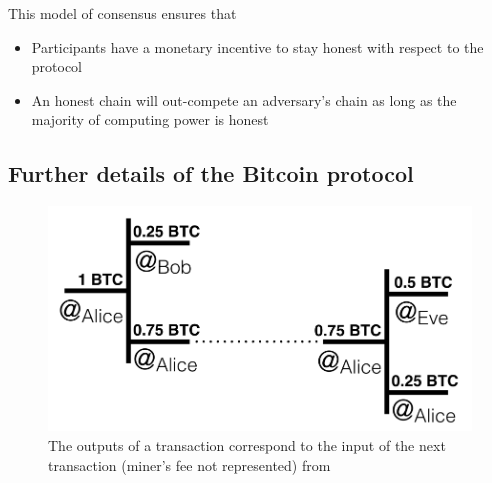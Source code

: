 This model of consensus ensures that
\begin{itemize}
    \item Participants have a monetary incentive to stay honest with respect to the protocol
    \item An honest chain will out-compete an adversary's chain as long as the majority of computing power is honest
\end{itemize}

\subsection{Further details of the Bitcoin protocol}\label{subsec:btc.details}
\begin{figure}[th]
    \centering
    \includegraphics[width=0.6\columnwidth]{figures/bitcoin-2txs-outputs}
    \caption[Outputs and Inputs of two consecutive Transactions]{The outputs of a transaction correspond to
    the input of the next transaction (miner's fee not represented) from~\cite{gervais2022distribLedgers_transactionsInBitcoin}}
    \label{fig:bitcoin-2txs-outputs}
\end{figure}


